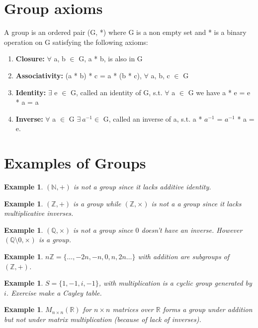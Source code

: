 \documentclass[oneside,11pt,pdftex]{book}%
\numberwithin{equation}{section}
\newtheorem{example}[theorem]{Example}
\numberwithin{section}{chapter}
\numberwithin{equation}{chapter}
\newcommand{\R}{\mathbb{R}}
\newcommand{\Q}{\mathbb{Q}}
\newcommand{\Z}{\mathbb{Z}}
\newcommand{\N}{\mathbb{N}}
\begin{document}
\section{Group axioms}
A group is an ordered pair (G, *) where G is a non empty set and * is a binary operation on G satisfying the following axioms:\\
\begin{enumerate}
	\item \textbf{Closure:} $\forall$ a, b $\in$ G, a * b, is also in G
	\item \textbf{Associativity:} (a * b) * c = a * (b * c), $\forall$ a, b, c $\in$ G
	\item \textbf{Identity:} $\exists$ e $\in$ G, called an identity of G, s.t. $\forall$ a $\in$ G we have a * e = e * a = a
	\item \textbf{Inverse:} $\forall$ a $\in$ G $\exists \ a^{-1} \in$ G, called an inverse of a, s.t. a * $a^{-1}$ = $a^{-1}$ * a = e.
\end{enumerate}
\section{Examples of Groups}
\begin{example}
	$(\N,+)$ is not a group since it lacks additive identity.
\end{example}
\begin{example}
	$(\Z,+)$ is a group while $ (\Z, \times) $ is not a a group since it lacks multiplicative inverses.
\end{example}
\begin{example}
	$ (\Q, \times) $ is not a group since $ 0 $ doesn't have an inverse. However $ (\Q \setminus 0, \times) $ is a group.
\end{example}

\begin{example}
	$ n \Z=\{\dots,-2n, -n, 0, n, 2n \dots\} $ with addition are subgroups of $ (\Z,+) $.
\end{example}

\begin{example}
	$ S=\{1,-1,i,-1\} $, with multiplication is a cyclic group generated by $ i $. Exercise make a Cayley table.
\end{example}

\begin{example}
	$ M_{n\times n } (\R)$ for $ n \times n  $ matrices over $ \R $ forms a group under addition but not under matrix multiplication (because of lack of inverses).
\end{example}
\end{document}
